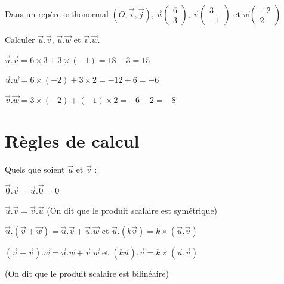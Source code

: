 \documentclass[french]{book}
\newcommand{\vect}[1]{\overrightarrow{#1}}
\newcommand{\oij}{(\textit{O},{\overrightarrow{i}},{\overrightarrow{j}})}
\newcommand{\cp}[2]{%
        \begin{pmatrix}
        #1\\
        #2
        \end{pmatrix}%
        }
\begin{document}
\begin{exemple}
Dans un rep\`ere orthonormal $\oij$, $\vect{u}\cp{6}{3}$, $\vect{v}\cp{3}{-1}$ et $\vect{w}\cp{-2}{2}$

Calculer $\vect{u}.\vect{v}$, $\vect{u}.\vect{w}$ et $\vect{v}.\vect{w}$.
\end{exemple}


$\vect{u}.\vect{v}= 6\times3+3\times(-1)=18-3=15$

$\vect{u}.\vect{w}=6\times(-2)+3\times2=-12+6=-6$

$\vect{v}.\vect{w}=3\times(-2)+(-1)\times2=-6-2=-8$



\section{R\`egles de calcul}
\begin{prop}
Quels que soient $\vect{u}$ et $\vect{v}$ :

\vspace{0.05cm}
\begin{itemize}
\begin{minipage}[c]{11cm}
\item $\vect{0}.\vect{v}=\vect{u}.\vect{0}=0$
\vspace{0.2cm}
\item $\vect{u}.\vect{v}=\vect{v}.\vect{u}$ \hfill (On dit que le produit scalaire est sym\'etrique)
\vspace{0.2cm}
\end{minipage}

\begin{minipage}{9cm}
\item $\vect{u}.(\vect{v}+\vect{w})=\vect{u}.\vect{v}+\vect{u}.\vect{w}$ et $\vect{u}.(k\vect{v})=k\times (\vect{u}.\vect{v})$

\vspace{0.2cm}
\item $(\vect{u}+\vect{v}).\vect{w}=\vect{u}.\vect{w}+\vect{v}.\vect{w}$ et $(k\vect{u}).\vect{v}=k\times (\vect{u}.\vect{v})$
\end{minipage}
\hspace{0.5cm}
\begin{minipage}[c]{4cm}
(On dit que le produit scalaire est bilin\'eaire)
\end{minipage}
\end{itemize}
\end{prop}
\end{document}

